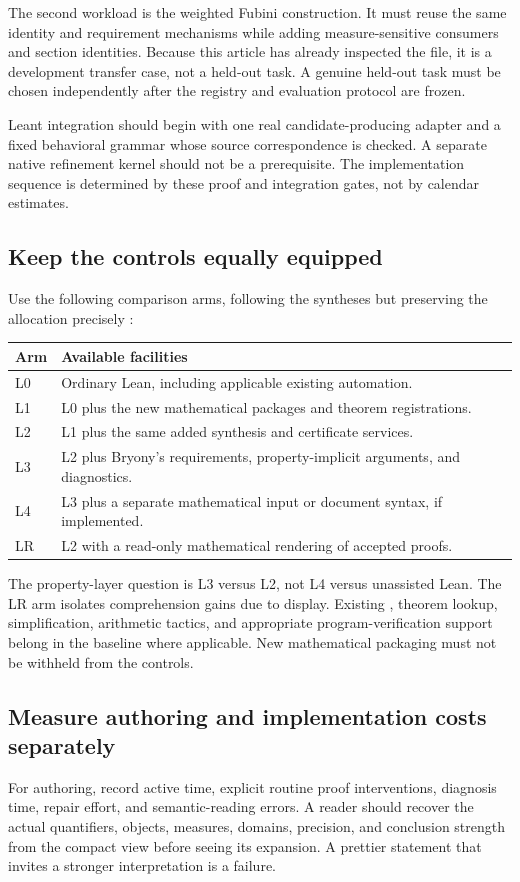 \documentclass[11pt,a4paper]{article}
\newcommand{\code}[1]{\texttt{\detokenize{#1}}}
\theoremstyle{definition}\newtheorem{definition}[theorem]{Definition}
\theoremstyle{remark}\newtheorem{remark}[theorem]{Remark}
\begin{document}
The second workload is the weighted Fubini construction. It must reuse the same identity and requirement mechanisms while adding measure-sensitive consumers and section identities. Because this article has already inspected the file, it is a development transfer case, not a held-out task. A genuine held-out task must be chosen independently after the registry and evaluation protocol are frozen.

Leant integration should begin with one real candidate-producing adapter and a fixed behavioral grammar whose source correspondence is checked. A separate native refinement kernel should not be a prerequisite. The implementation sequence is determined by these proof and integration gates, not by calendar estimates.

\subsection{Keep the controls equally equipped}
Use the following comparison arms, following the syntheses but preserving the allocation precisely \cite{synA,synB}:
\begin{center}\small
\begin{tabularx}{\textwidth}{@{}l Y@{}}
\toprule Arm & Available facilities\\\midrule
L0 & Ordinary Lean, including applicable existing automation.\\
L1 & L0 plus the new mathematical packages and theorem registrations.\\
L2 & L1 plus the same added synthesis and certificate services.\\
L3 & L2 plus Bryony's requirements, property-implicit arguments, and diagnostics.\\
L4 & L3 plus a separate mathematical input or document syntax, if implemented.\\
LR & L2 with a read-only mathematical rendering of accepted proofs.\\
\bottomrule
\end{tabularx}
\end{center}
The property-layer question is L3 versus L2, not L4 versus unassisted Lean. The LR arm isolates comprehension gains due to display. Existing \code{fun_prop}, theorem lookup, simplification, arithmetic tactics, and appropriate program-verification support belong in the baseline where applicable. New mathematical packaging must not be withheld from the controls.

\subsection{Measure authoring and implementation costs separately}
For authoring, record active time, explicit routine proof interventions, diagnosis time, repair effort, and semantic-reading errors. A reader should recover the actual quantifiers, objects, measures, domains, precision, and conclusion strength from the compact view before seeing its expansion. A prettier statement that invites a stronger interpretation is a failure.
\end{document}
